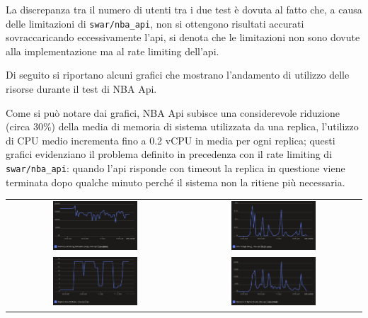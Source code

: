 La discrepanza tra il numero di utenti tra i due test è dovuta al fatto che, a causa delle limitazioni di \texttt{swar/nba\_api}, non si ottengono risultati accurati sovraccaricando eccessivamente l'api, si denota che le limitazioni non sono dovute alla implementazione ma al rate limiting dell'api.

Di seguito si riportano alcuni grafici che mostrano l'andamento di utilizzo delle risorse durante il test di NBA Api.

Come si può notare dai grafici, NBA Api subisce una considerevole riduzione (circa 30\%) della media di memoria di sistema utilizzata da una replica, l'utilizzo di CPU medio incrementa fino a 0.2 vCPU in media per ogni replica; questi grafici evidenziano il problema definito in precedenza con il rate limiting di \texttt{swar/nba\_api}: quando l'api risponde con timeout la replica in questione viene terminata dopo qualche minuto perché il sistema non la ritiene più necessaria.

\begin{tabular}{ c c }
    \includegraphics[width=0.5\textwidth]{img/load_test/nba-api-mem-avg.png} & \includegraphics[width=0.5\textwidth]{img/load_test/nba-api-cpu-avg.png} \\
    \includegraphics[width=0.5\textwidth]{img/load_test/nba-api-rep-count.png} & \includegraphics[width=0.5\textwidth]{img/load_test/nba-api-rx-sum.png} \\
\end{tabular}

